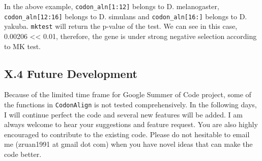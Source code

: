 \documentclass{article}
\begin{document}
In the above example, \texttt{codon\_aln{[}1:12{]}} belongs to
D. melanogaster, \texttt{codon\_aln{[}12:16{]}} belongs to D. simulans
and \texttt{codon\_aln{[}16:{]}} belongs to D. yakuba. \texttt{mktest}
will return the p-value of the test. We can see in this case, 0.00206
\textless{}\textless{} 0.01, therefore, the gene is under strong
negative selection according to MK test.

\subsection{X.4 Future Development}

Because of the limited time frame for Google Summer of Code project,
some of the functions in \texttt{CodonAlign} is not tested
comprehensively. In the following days, I will continue perfect the code
and several new features will be added. I am always welcome to hear your
suggestions and feature request. You are also highly encouraged to
contribute to the existing code. Please do not hesitable to email me
(zruan1991 at gmail dot com) when you have novel ideas that can make the
code better.
\end{document}
